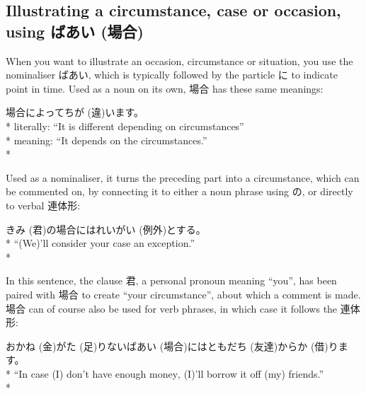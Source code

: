 \documentclass[11pt, b5paper, twoside, openright, onecolumn]{book}
\makeatletter
\newcommand*{\rubystack}[2]{{\relscale{0.5}%
  \begin{tabular}[b]{@{}c@{}}%
    {#1}\\%
   {\textscale{2}{#2}}%
  \end{tabular}}%
}
\DeclareRobustCommand*{\ruby}[2]{%
  \mbox{%
    \setlength{\parskip}{0ex}%
    \BeginAccSupp{method=pdfstringdef,ActualText={#1}}%
      \rubystack{\phantom{#2}}{#1}%
      \llap{%
        \rubystack{#2}{\phantom{#1}}%
      }%
    \EndAccSupp{}%
  }%
}
\renewcommand*{\ruby}[2]{#2 (#1)}%
\newenvironment{exampleblock}{
\setlength{\parindent}{0.6in}
\begin{minipage}[t]{\dimexpr\textwidth-\parindent}}
{\end{minipage}}
\makeatother
\begin{document}
\subsection{Illustrating a circumstance‚ case or occasion‚ using \ruby{場合}{ばあい}}

When you want to illustrate an occasion‚ circumstance or situation‚ you use the nominaliser ばあい‚ which is typically followed by the particle に to indicate point in time. Used as a noun on its own‚ 場合 has these same meanings:

\vspace{0.4cm}
\begin{exampleblock}
場合によって\ruby{違}{ちが}います。 \\* 
literally: “It is different depending on circumstances” \\* 
meaning: “It depends on the circumstances.” \\* 
\end{exampleblock}
\vspace{0.2cm}

Used as a nominaliser‚ it turns the preceding part into a circumstance‚ which can be commented on‚ by connecting it to either a noun phrase using の‚ or directly to verbal 連体形:

\vspace{0.4cm}
\begin{exampleblock}
\ruby{君}{きみ}の場合には\ruby{例外}{れいがい}とする。 \\* 
“(We)’ll consider your case an exception.” \\* 
\end{exampleblock}
\vspace{0.2cm}

In this sentence‚ the clause 君‚ a personal pronoun meaning “you”‚ has been paired with 場合 to create “your circumstance”‚ about which a comment is made. 場合 can of course also be used for verb phrases‚ in which case it follows the 連体形:

\vspace{0.4cm}
\begin{exampleblock}
お\ruby{金}{かね}が\ruby{足}{た}りない\ruby{場合}{ばあい}には\ruby{友達}{ともだち}から\ruby{借}{か}ります。 \\* 
“In case (I) don’t have enough money‚ (I)’ll borrow it off (my) friends.” \\* 
\end{exampleblock}
\vspace{0.2cm}
\end{document}
